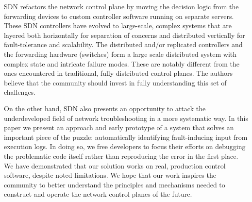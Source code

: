 

SDN refactors the network control plane by moving the decision logic from the
forwarding devices to custom controller software running on separate servers.
These SDN controllers have evolved to large-scale, complex systems that are
layered both horizontally for separation of concerns and distributed vertically
for fault-tolerance and scalability. The distributed and/or replicated
controllers and the forwarding hardware (switches) form a large scale
distributed system with complex state and intricate failure modes. These are
notably different from the ones encountered in traditional, fully distributed
control planes. The authors believe that the community should invest in fully
understanding this set of challenges.

On the other hand, SDN also presents an opportunity to attack the underdeveloped
field of network troubleshooting in a more systematic way. In this paper we
present an approach and early prototype of a system that solves an important
piece of the puzzle: automatically identifying fault-inducing input from
execution logs. In doing so, we free developers to focus their efforts on
debugging the problematic code itself rather than reproducing the error in the
first place. We have demonstrated that our solution works on real, production
control software, despite noted limitations. We hope that our work inspires the
community to better understand the principles and mechanisms needed to construct
and operate the network control planes of the future.

